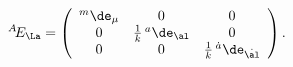 \begin{equation} \label{eflat}
^A\!E_\La=\left(\begin{array}{ccc} ^m\de_\mu & 0 & 0 \\
0 & \frac{1}{k}\,^a\de_\al & 0 \\
0 & 0 & \frac{1}{k}\,^{\dot{a}}\de_{\dot{\al}} \end{array}\right).
\end{equation}

